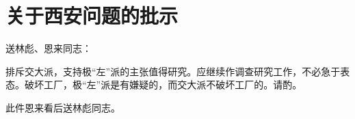 \section[关于西安问题的批示（一九六七年二月十四日）]{关于西安问题的批示}


\noindent 送林彪、恩来同志：

排斥交大派，支持极“左”派的主张值得研究。应继续作调查研究工作，不必急于表态。破坏工厂，极“左”派是有嫌疑的，而交大派不破坏工厂的。请酌。

此件恩来看后送林彪同志。



